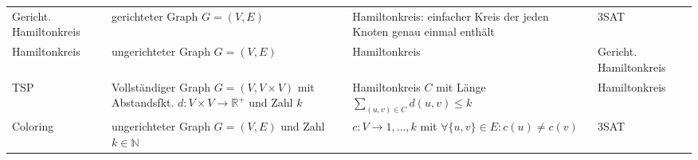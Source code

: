 \documentclass{article}
\begin{document}
\begin{tabular}{p{1.6cm}p{6cm}p{6cm}p{1.8cm}}
		Gericht. Hamiltonkreis &	gerichteter Graph $G=(V,E)$	&	Hamiltonkreis: einfacher Kreis der jeden Knoten genau einmal enthält	& 3SAT \\
		Hamiltonkreis & ungerichteter Graph $G=(V,E)$	&	Hamiltonkreis	& Gericht. Hamiltonkreis \\
		TSP					& Vollständiger Graph $G=(V,V\times V)$ mit Abstandsfkt. $d:V\times V\to\mathbb{R}^+$ und Zahl $k$ & Hamiltonkreis $C$ mit Länge $\sum_{(u,v)\in C} d(u,v)\le k$ & Hamiltonkreis \\
		Coloring		&	ungerichteter Graph $G=(V,E)$ und Zahl $k \in \mathbb{N}$ &	$c:V\to 1,\ldots,k$ mit $\forall{\{u,v\}\in E}: c(u) \ne c(v)$	& 3SAT \\
								
		\end{tabular}
\end{document}
